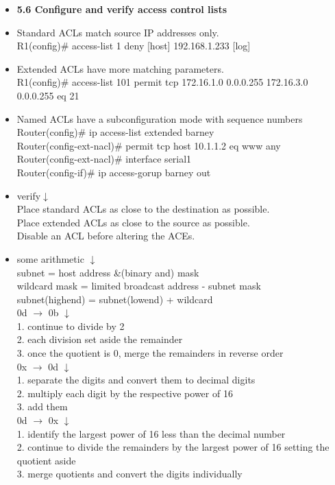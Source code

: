 \documentclass{article}
\begin{document}
\begin{itemize}
  \item \textbf{5.6 Configure and verify access control lists}
  	\item[] Standard ACLs match source IP addresses only.\\
  		R1(config)\# access-list 1 deny [host] 192.168.1.233 [log]
  	\item[] Extended ACLs have more matching parameters.\\
  		R1(config)\# access-list 101 permit tcp 172.16.1.0 0.0.0.255 172.16.3.0 0.0.0.255 eq 21
  	\item[] Named ACLs have a subconfiguration mode with sequence numbers\\
  		Router(config)\# ip access-list extended barney\\
  		Router(config-ext-nacl)\# permit tcp host 10.1.1.2 eq www any\\
  		Router(config-ext-nacl)\# interface serial1\\
  		Router(config-if)\# ip access-gorup barney out
  	\item[] verify$\downarrow$\\
  		Place standard ACLs as close to the destination as possible.\\
  		Place extended ACLs as close to the source as possible.\\
  		Disable an ACL before altering the ACEs.
  		
  	\item[] some arithmetic $\downarrow$\\
  		subnet = host address \&(binary and) mask\\ 
  		wildcard mask = limited broadcast address - subnet mask\\
  		subnet(highend) = subnet(lowend) + wildcard\\
  		0d $\rightarrow$ 0b $\downarrow$\\
  		1. continue to divide by 2\\
  		2. each division set aside the remainder\\
  		3. once the quotient is 0, merge the remainders in reverse order\\
  		0x $\rightarrow$ 0d $\downarrow$\\
  		1. separate the digits and convert them to decimal digits\\
  		2. multiply each digit by the respective power of 16\\
  		3. add them\\
  		0d $\rightarrow$ 0x $\downarrow$\\
  		1. identify the largest power of 16 less than the decimal number\\
  		2. continue to divide the remainders by the largest power of 16 setting the quotient aside\\
  		3. merge quotients and convert the digits individually
  		

\end{itemize}
\end{document}
